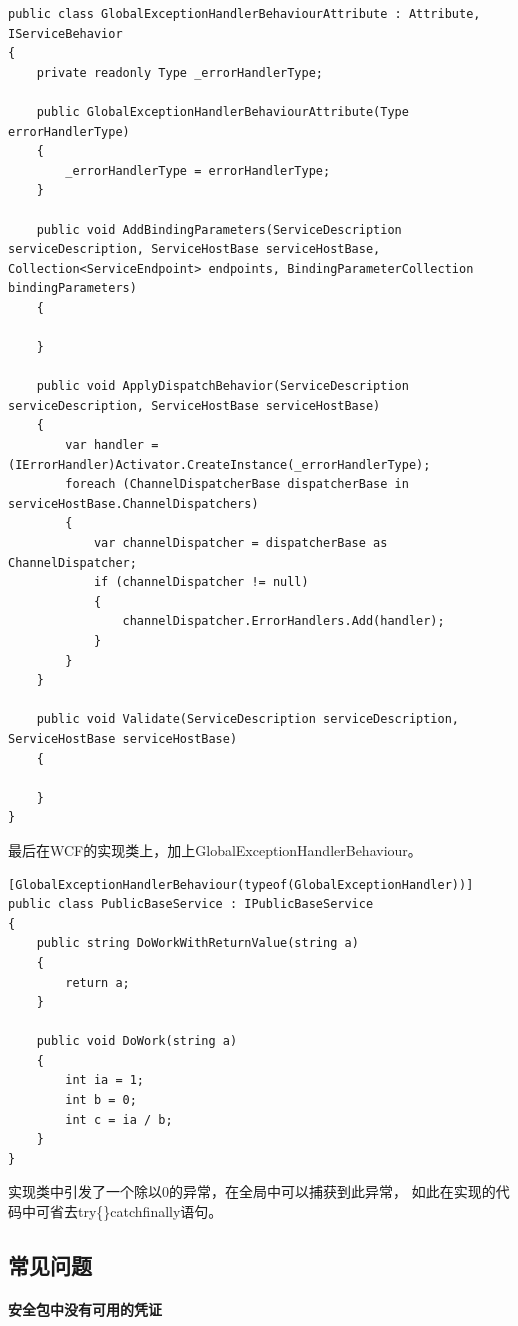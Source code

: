 \documentclass{book}
\begin{document}
\begin{lstlisting}[language={[Sharp]C},caption=实现IServiceBehavior接口]
public class GlobalExceptionHandlerBehaviourAttribute : Attribute, IServiceBehavior
{
    private readonly Type _errorHandlerType;

    public GlobalExceptionHandlerBehaviourAttribute(Type errorHandlerType)
    {
        _errorHandlerType = errorHandlerType;
    }

    public void AddBindingParameters(ServiceDescription serviceDescription, ServiceHostBase serviceHostBase, Collection<ServiceEndpoint> endpoints, BindingParameterCollection bindingParameters)
    {

    }

    public void ApplyDispatchBehavior(ServiceDescription serviceDescription, ServiceHostBase serviceHostBase)
    {
        var handler = (IErrorHandler)Activator.CreateInstance(_errorHandlerType);
        foreach (ChannelDispatcherBase dispatcherBase in serviceHostBase.ChannelDispatchers)
        {
            var channelDispatcher = dispatcherBase as ChannelDispatcher;
            if (channelDispatcher != null)
            {
                channelDispatcher.ErrorHandlers.Add(handler);
            }
        }
    }

    public void Validate(ServiceDescription serviceDescription, ServiceHostBase serviceHostBase)
    {

    }
}
\end{lstlisting}

最后在WCF的实现类上，加上GlobalExceptionHandlerBehaviour。

\begin{lstlisting}[language={[Sharp]C}]
[GlobalExceptionHandlerBehaviour(typeof(GlobalExceptionHandler))]
public class PublicBaseService : IPublicBaseService
{   
    public string DoWorkWithReturnValue(string a)
    {
        return a;
    }

    public void DoWork(string a)
    {
        int ia = 1;
        int b = 0;
        int c = ia / b;
    }
}
\end{lstlisting}

实现类中引发了一个除以0的异常，在全局中可以捕获到此异常，
如此在实现的代码中可省去try\{\}catch{}finally{}语句。

\subsection{常见问题}

\paragraph{安全包中没有可用的凭证}
\end{document}
